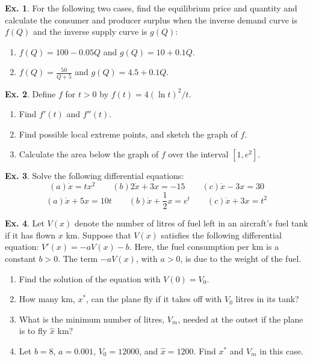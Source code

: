 \documentclass[10pt,a4paper]{book}
\theoremstyle{definition}\newtheorem{definition}{Definition}
\theoremstyle{definition}\newtheorem{fact}{Fact}
\theoremstyle{definition}\newtheorem{ex}{Ex.}
\theoremstyle{definition}\newtheorem{project}{Project}
\theoremstyle{definition}\newtheorem{problem}{Problem}
\theoremstyle{definition}\newtheorem{example}{Example}
\numberwithin{theorem}{chapter}
\numberwithin{corollary}{chapter}
\numberwithin{assumption}{chapter}
\numberwithin{definition}{chapter}
\numberwithin{prop}{chapter}
\numberwithin{notation}{chapter}
\numberwithin{problem}{chapter}
\numberwithin{example}{chapter}
\numberwithin{fact}{chapter}
\numberwithin{ex}{chapter}
\begin{document}
	\begin{ex}
		For the following two cases, find the equilibrium price and quantity and calculate the consumer and producer surplus when the inverse demand curve is $f (Q)$ and the inverse supply curve is $g(Q)$:
		\begin{enumerate}[label=(\alph*)]
			\item $f(Q)=100-0.05Q$ and $g(Q)=10+0.1Q$.
			\item $f(Q)=\frac{50}{Q+5}$ and $g(Q)=4.5+0.1Q$.
		\end{enumerate}
	\end{ex}
	
	\begin{ex}
		Define $f$ for $t>0$ by $f(t)=4(\ln t)^2/t$.
		\begin{enumerate}[label=(\alph*)]
			\item Find $f'(t)$ and $f''(t)$.
			\item Find possible local extreme points, and sketch the graph of $f$.
			\item Calculate the area below the graph of $f$ over the interval $[1,e^2]$.
		\end{enumerate}
	\end{ex}
	
	\begin{ex}
		Solve the following differential equations:
		\begin{equation*}
			(a) \dot{x} = tx^2 \qquad
			(b) 2\dot{x} +3x= -15 \qquad
			(c) \dot{x}-3x =30
		\end{equation*}
		\begin{equation*}
			(a) \dot{x} +5x= 10t \qquad
			(b) \dot{x}+\frac{1}{2} x = e^t \qquad
			(c) \dot{x}+3x = t^2
		\end{equation*}
	\end{ex}
	
	\begin{ex}
		Let $V(x)$ denote the number of litres of fuel left in an aircraft’s fuel tank if it has flown $x$ km. Suppose that $V(x)$ satisfies the following differential equation: $V'(x) = -aV(x) - b$. Here, the fuel consumption per km is a constant $b > 0$. The term $-aV(x)$, with $a > 0$, is due to the weight of the fuel.
		\begin{enumerate}[label=(\alph*)]
			\item Find the solution of the equation with $V(0) = V_0$.
			\item How many km, $x^{*}$, can the plane fly if it takes off with $V_0$ litres in its tank?
			\item What is the minimum number of litres, $V_m$, needed at the outset if the plane is to fly $\hat{x}$ km?
			\item Let $b=8$, $a=0.001$, $V_0 =12000$, and $\hat{x} =1200$. Find $x^{*}$ and $V_m$ in this case.
		\end{enumerate}
	\end{ex}
	
\end{document}
